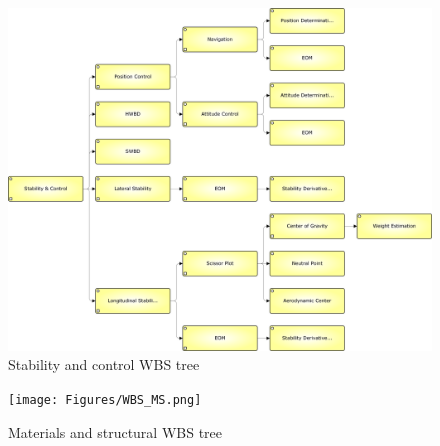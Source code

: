 \documentclass[a4paper]{report}
\begin{document}
\begin{figure}
\label{fig:WBSSC}
\centering
\includegraphics[width=\textwidth]{Figures/WBS_SC.png}

\caption{Stability and control WBS tree}
\end{figure}


\begin{figure}
\label{fig:WBSMS}
\centering
\texttt{[image: Figures/WBS\_MS.png]}

\caption{Materials and structural WBS tree}
\end{figure}
\end{document}
